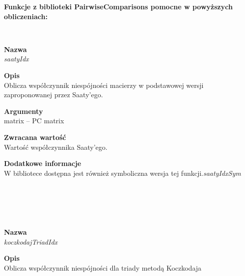 \textbf{Funkcje z biblioteki PairwiseComparisons pomocne w powyższych obliczeniach:}
\\
\begin{spacing}{1.1}
 \\ \begin{spacing}{0.5}  \end{spacing}

\textbf{Nazwa}\\ \emph{saatyIdx} \\ \begin{spacing}{0.3}  \end{spacing}
 
\textbf{Opis}\\ Oblicza współczynnik niespójności macierzy w podstawowej wersji zaproponowanej przez Saaty'ego.\\  \begin{spacing}{0.3}  \end{spacing}
 
\textbf{Argumenty} \\
matrix -- PC matrix \\ \begin{spacing}{0.3}  \end{spacing}

\textbf{Zwracana wartość}\\ Wartość współczynnika Saaty'ego. \\ \begin{spacing}{0.3}  \end{spacing}

\textbf{Dodatkowe informacje} \\ W bibliotece dostępna jest również symboliczna wersja tej funkcji.\emph{saatyIdxSym}


\\~\\ 
\begin{spacing}{1.2}
 \\ \begin{spacing}{0.5}  \end{spacing}

\textbf{Nazwa}\\  \emph{koczkodajTriadIdx} \\ \begin{spacing}{0.3}  \end{spacing}
 
\textbf{Opis}\\ Oblicza współczynnik niespójności dla triady metodą Koczkodaja\\  \begin{spacing}{0.3}  \end{spacing}
 

\end{spacing}
\end{spacing}
